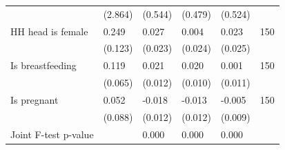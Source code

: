 \begin{tabular}{llllll}
 & (2.864) & (0.544) & (0.479) & (0.524) & \\
HH head is female & 0.249 & 0.027 & 0.004 & 0.023 & 150\\
 & (0.123) & (0.023) & (0.024) & (0.025) & \\
\addlinespace
Is breastfeeding & 0.119 & 0.021 & 0.020 & 0.001 & 150\\
 & (0.065) & (0.012) & (0.010) & (0.011) & \\
Is pregnant & 0.052 & -0.018 & -0.013 & -0.005 & 150\\
 & (0.088) & (0.012) & (0.012) & (0.009) & \\
Joint F-test p-value &  & 0.000 & 0.000 & 0.000 & \\
\bottomrule
\end{tabular}

